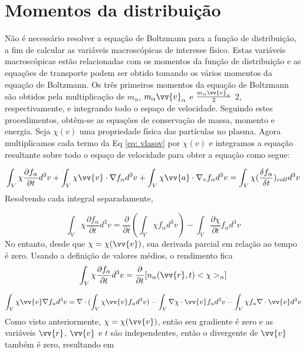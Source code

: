 \documentclass[12pt,oneside,a4paper]{abntex2}
\theoremstyle{definition}  %
\begin{document}
\section{Momentos da distribuição}
Não é necessário resolver a equação de Boltzmann para a função de distribuição, a fim de calcular as variáveis macroscópicas de interesse físico. Estas variáveis macroscópicas estão relacionadas com os momentos da função de distribuição e as equações de transporte podem
ser obtido tomando os vários momentos da equação de Boltzmann. Os três primeiros momentos da equação de Boltzmann são obtidos pela multiplicação de $m_\alpha$, $m_\alpha \vv{v}_\alpha$ e $\frac{m_\alpha \vv{v}_\alpha}{2}$
2,
respectivamente, e integrando todo o espaço de velocidade. Seguindo estes procedimentos, obtêm-se as equações de conservação de massa, momento e energia. Seja $\chi(v)$ uma propriedade física das partículas no plasma. Agora multiplicamos cada termo da Eq \ref{eq: vlasov} por $\chi(v)$ e integramos a equação resultante sobre todo o espaço de velocidade para obter a equação como segue:

\begin{equation}
\label{eq: pit3}
\int_V \chi \frac{\partial f_\alpha}{\partial t} d^3 v + \int_V \chi \vv{v} \cdot \nabla f_\alpha d^3 v + \int_V \chi \vv{a} \cdot \nabla_v f_\alpha d^3 v = \int_V \chi (\frac{\delta f_\alpha}{\delta t})_{coll} d^3 v
\end{equation}
Resolvendo cada integral separadamente,

\begin{equation}
\label{eq: pit4}
\int_V \chi \frac{\partial f_\alpha}{\partial t} d^3 v  = \frac{\partial }{\partial t} (\int_V \chi f_\alpha d^3 v)-\int_V \frac{\partial \chi}{\partial t} f_\alpha d^3 v
\end{equation}
No entanto, desde que $\chi = \chi(\vv{v})$, sua derivada parcial em relação ao tempo é zero. Usando a definição de valores médios, o rendimento fica
\begin{equation}
\label{eq: pit5}
\int_V \chi \frac{\partial f_\alpha}{\partial t} d^3 v = \frac{\partial}{\partial t} [n_\alpha(\vv{r},t)<\chi>_\alpha]
\end{equation}

\begin{equation}
\label{eq: pit6}
\int_V \chi \vv{v} \nabla f_\alpha d^3 v = \nabla \cdot ( \int_V \chi \vv{v} f_\alpha d^3 v ) - \int_V \nabla \chi \cdot \vv{v} f_\alpha d^3 v - \int_V \chi  f_\alpha \nabla \cdot \vv{v}  d^3 v
\end{equation}
Como visto anteriormente, $\chi = \chi(\vv{v})$, então seu gradiente é zero e as variáveis $\vv{r}$, $\vv{v}$ e $t$ são independentes, então o divergente de $\vv{v}$ também é zero, resultando em
\end{document}
